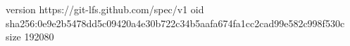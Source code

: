 version https://git-lfs.github.com/spec/v1
oid sha256:0e9e2b5478dd5c09420a4e30b722c34b5aafa674fa1cc2cad99e582c998f530c
size 192080
